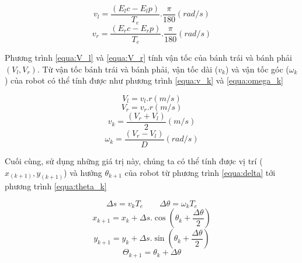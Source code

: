 {\begin{equation}
  {v}_{l} = \frac{({E}_{l}c - {E}_{l}p)}{{T}_{e}}.\frac{\pi}{180}  (rad/s)
  \label{equa:deadReckoning-vl}
\end{equation}
\begin{equation}
  {v}_{r} = \frac{({E}_{r}c - {E}_{r}p)}{{T}_{e}}.\frac{\pi}{180}  (rad/s)
  \label{equa:deadReckoning-vr}
\end{equation}

Phương trình \ref{equa:V_l} và \ref{equa:V_r} tính vận tốc của bánh trái và bánh phải $({V}_{l}, {V}_{r})$. Từ vận tốc bánh trái và bánh phải, vận tốc dài (${v}_{k}$) và vận tốc góc (${\omega}_{k}$) của robot có thể tính được như phương trình \ref{equa:v_k} và \ref{equa:omega_k}

\begin{equation}
  {V}_{l} = {v}_{l}.r (m/s)
  \label{equa:V_l}
\end{equation}
\begin{equation}
  {V}_{r} = {v}_{r}.r (m/s)
  \label{equa:V_r}
\end{equation}
\begin{equation}
  {v}_{k} = \frac{({V}_{r}+{V}_{l})}{2} (m/s)
  \label{equa:v_k}
\end{equation}
\begin{equation}
  {\omega}_{k} = \frac{({V}_{r}-{V}_{l})}{D} (rad/s)
  \label{equa:omega_k}
\end{equation}

Cuối cùng, sử dụng những giá trị này, chúng ta có thể tính được vị trí (${x}_{(k+1)},{y}_{(k+1)}$) và hướng ${\theta}_{k+1}$ của robot từ phương trình \ref{equa:delta} tới phương trình \ref{equa:theta_k}

\begin{equation}
  {\Delta}s = {v}_{k}{T}_{e} \qquad
  {\Delta}{\theta} = {\omega}_{k}{T}_{e}
  \label{equa:delta}
\end{equation}
\begin{equation}
  {x}_{k+1} = {x}_{k} + {\Delta}s .{\cos} \left( {\theta}_{k}+\frac{{\Delta}{\theta}}{2} \right)
  \label{equa:x_kp1}
\end{equation}
\begin{equation}
  {y}_{k+1} = {y}_{k} + {\Delta}s .{\sin} \left( {\theta}_{k}+\frac{{\Delta}{\theta}}{2} \right)
  \label{equa:y_kp1}
\end{equation}
\begin{equation}
  {\Theta}_{k+1} = {\theta}_{k} + {\Delta}{\theta}
  \label{equa:theta_k}
\end{equation}

}
